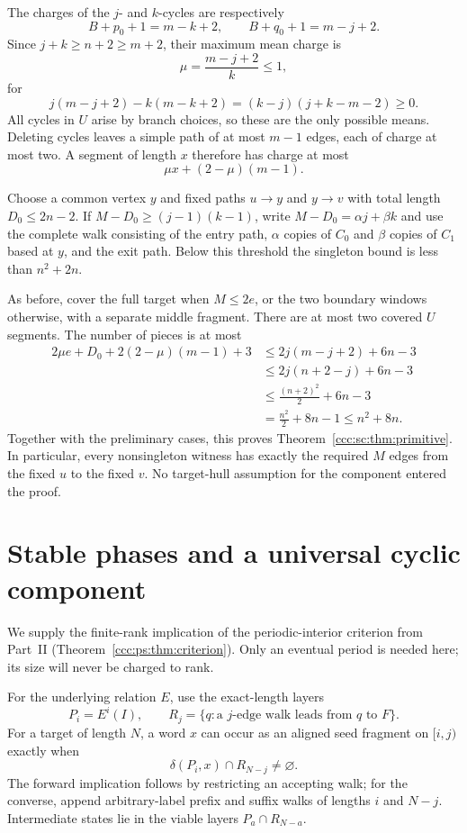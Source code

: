 \documentclass[11pt,letterpaper]{article}
\theoremstyle{definition}
\theoremstyle{remark}
\begin{document}
The charges of the $j$- and $k$-cycles are respectively
\[
 B+p_0+1=m-k+2,\qquad B+q_0+1=m-j+2.
\]
Since $j+k\ge n+2\ge m+2$, their maximum mean charge is
\[
 \mu=\frac{m-j+2}{k}\le1,
\]
for
\[
 j(m-j+2)-k(m-k+2)=(k-j)(j+k-m-2)\ge0.
\]
All cycles in $U$ arise by branch choices, so these are the only possible means. Deleting cycles leaves a simple path of at most $m-1$ edges, each of charge at most two. A segment of length $x$ therefore has charge at most
\[
 \mu x+(2-\mu)(m-1).
\]

Choose a common vertex $y$ and fixed paths $u\to y$ and $y\to v$ with total length $D_0\le2n-2$. If $M-D_0\ge(j-1)(k-1)$, write $M-D_0=\alpha j+\beta k$ and use the complete walk consisting of the entry path, $\alpha$ copies of $C_0$ and $\beta$ copies of $C_1$ based at $y$, and the exit path. Below this threshold the singleton bound is less than $n^2+2n$.

As before, cover the full target when $M\le2e$, or the two boundary windows otherwise, with a separate middle fragment. There are at most two covered $U$ segments. The number of pieces is at most
\begin{align*}
 2\mu e+D_0+2(2-\mu)(m-1)+3
 &\le2j(m-j+2)+6n-3\\
 &\le2j(n+2-j)+6n-3\\
 &\le\frac{(n+2)^2}{2}+6n-3\\
 &=\frac{n^2}{2}+8n-1\le n^2+8n.
\end{align*}
Together with the preliminary cases, this proves Theorem~\ref{ccc:sc:thm:primitive}. In particular, every nonsingleton witness has exactly the required $M$ edges from the fixed $u$ to the fixed $v$. No target-hull assumption for the component entered the proof.
\section{Stable phases and a universal cyclic component}\label{ccc:sc:sec:periodic}

We supply the finite-rank implication of the periodic-interior criterion from Part~II (Theorem~\ref{ccc:ps:thm:criterion}). Only an eventual period is needed here; its size will never be charged to rank.

For the underlying relation $E$, use the exact-length layers
\[
 P_i=E^i(I),\qquad R_j=\{q:\text{a $j$-edge walk leads from $q$ to }F\}.
\]
For a target of length $N$, a word $x$ can occur as an aligned seed fragment on $[i,j)$ exactly when
\begin{equation}\label{ccc:sc:eq:fragment-test}
 \delta(P_i,x)\cap R_{N-j}\ne\varnothing.
\end{equation}
The forward implication follows by restricting an accepting walk; for the converse, append arbitrary-label prefix and suffix walks of lengths $i$ and $N-j$. Intermediate states lie in the viable layers $P_a\cap R_{N-a}$.
\end{document}
